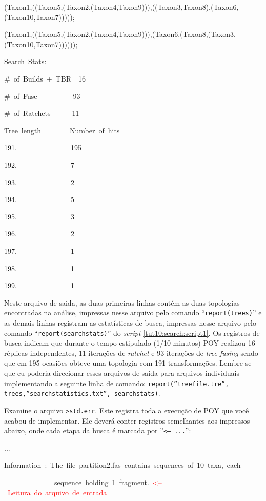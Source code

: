 \begin{refsection}
\scriptsize

(Taxon1,((Taxon5,(Taxon2,(Taxon4,Taxon9))),((Taxon3,Taxon8),(Taxon6,(Taxon10,Taxon7)))));

(Taxon1,((Taxon5,(Taxon2,(Taxon4,Taxon9))),(Taxon6,(Taxon8,(Taxon3,(Taxon10,Taxon7))))));

Search~Stats:

\#~of~Builds~+~TBR~~16

\#~of~Fuse~~~~~~~~~~93

\#~of~Ratchets~~~~~~11

Tree~length~~~~~~~~Number~of~hits

191.~~~~~~~~~~~~~~~195

192.~~~~~~~~~~~~~~~7

193.~~~~~~~~~~~~~~~2

194.~~~~~~~~~~~~~~~5

195.~~~~~~~~~~~~~~~3

196.~~~~~~~~~~~~~~~2

197.~~~~~~~~~~~~~~~1

198.~~~~~~~~~~~~~~~1

199.~~~~~~~~~~~~~~~1

\normalsize

Neste arquivo de saida, as duas primeiras linhas contém as duas topologias encontradas na análise, impressas nesse arquivo pelo comando ``\texttt{report(trees)}'' e as demais linhas registram as estatísticas de busca, impressas nesse arquivo pelo comando ``\texttt{report(searchstats)}'' do \textit{script} \ref{tut10:search:script1}. Os registros de busca indicam que durante o tempo estipulado (1/10 minutos) POY realizou 16 réplicas independentes, 11 iterações de \textit{ratchet} e 93 iterações de \textit{tree fusing} sendo que em 195 ocasiões obteve uma topologia com 191 transformações. Lembre-se que eu poderia direcionar esses arquivos de saída para arquivos individuais implementando a seguinte linha de comando: \texttt{report(''treefile.tre'', trees,''searchstatistics.txt'', searchstats)}.

Examine o arquivo \texttt{>std.err}. Este registra toda a execução de POY que você acabou de implementar. Ele deverá conter registros semelhantes aos impressos abaixo, onde cada etapa da busca é marcada por ''\texttt{<-- ...}'':

\scriptsize

...

Information~:~The~file~partition2.fas~contains~sequences~of~10~taxa,~each

~~~~~~~~~~~~~~sequence~holding~1~fragment.~\textcolor{red}{<--~Leitura~do~arquivo~de~entrada}


\end{refsection}
